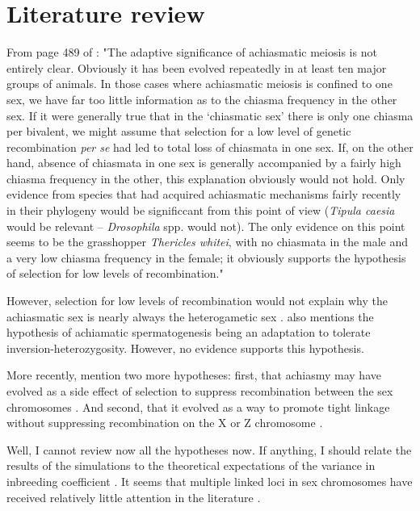 \documentclass[a4paper,12pt]{article}
\begin{document}
\section{Literature review}
From page 489 of \citet{White1973}: "The adaptive significance of achiasmatic meiosis is not entirely clear. Obviously it has been evolved repeatedly in at least ten major groups of animals. In those cases where achiasmatic meiosis is confined to one sex, we have far too little information as to the chiasma frequency in the other sex. If it were generally true that in the `chiasmatic sex' there is only one chiasma per bivalent, we might assume that selection for a low level of genetic recombination \emph{per se} had led to total loss of chiasmata in one sex. If, on the other hand, absence of chiasmata in one sex is generally accompanied by a fairly high chiasma frequency in the other, this explanation obviously would not hold. Only evidence from species that had acquired achiasmatic mechanisms fairly recently in their phylogeny would be significcant from this point of view (\emph{Tipula caesia} would be relevant -- \emph{Drosophila} spp. would not). The only evidence on this point seems to be the grasshopper \emph{Thericles whitei}, with no chiasmata in the male and a very low chiasma frequency in the female; it obviously supports the hypothesis of selection for low levels of recombination."

However, selection for low levels of recombination would not explain why the achiasmatic sex is nearly always the heterogametic sex \citep{Burt1991}. \citet{White1973} also mentions the hypothesis of achiamatic spermatogenesis being an adaptation to tolerate inversion-heterozygosity. However, no evidence supports this hypothesis.

More recently, \citet{Lenormand2016} mention two more hypotheses: first, that achiasmy may have evolved as a side effect of selection to suppress recombination between the sex chromosomes \cite{Haldane1922,Huxley1928}. And second, that it evolved as a way to promote tight linkage without suppressing recombination on the X or Z chromosome \citep{Lenormand2005}.

Well, I cannot review now all the hypotheses now. If anything, I should relate the results of the simulations to the theoretical expectations of the variance in inbreeding coefficient \citep{Cockerham1968,Franklin1977}. It seems that multiple linked loci in sex chromosomes have received relatively little attention in the literature \citep{Bennett1963,Owen1988}.
\end{document}
